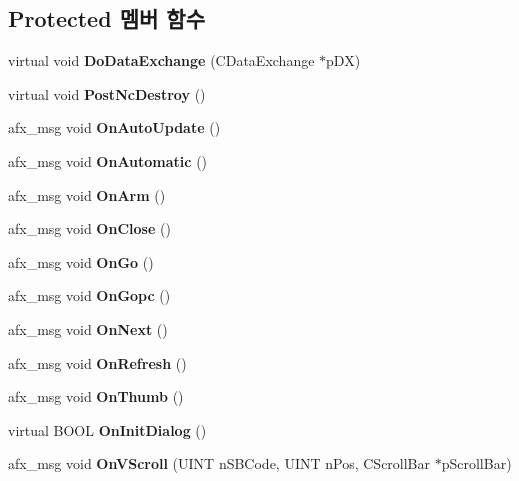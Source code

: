 \subsection*{Protected 멤버 함수}
\begin{DoxyCompactItemize}
\item 
\mbox{\label{class_disassemble_a41d0930174f47e08037b1ea675d03ba0}} 
virtual void {\bfseries Do\+Data\+Exchange} (C\+Data\+Exchange $\ast$p\+DX)
\item 
\mbox{\label{class_disassemble_a2ff6c6b502de3f37aaff6c2f188157a8}} 
virtual void {\bfseries Post\+Nc\+Destroy} ()
\item 
\mbox{\label{class_disassemble_a5423cb1c85c1e4bb05b3d4018c804826}} 
afx\+\_\+msg void {\bfseries On\+Auto\+Update} ()
\item 
\mbox{\label{class_disassemble_a713e75749b5c7c79927075b57431a298}} 
afx\+\_\+msg void {\bfseries On\+Automatic} ()
\item 
\mbox{\label{class_disassemble_a11695fe0ce9003a5cfcd58e86ad6047e}} 
afx\+\_\+msg void {\bfseries On\+Arm} ()
\item 
\mbox{\label{class_disassemble_a8f239c5117018f44ee0847b530a9eee1}} 
afx\+\_\+msg void {\bfseries On\+Close} ()
\item 
\mbox{\label{class_disassemble_add1cb356f3605cc46f9c83f29473db24}} 
afx\+\_\+msg void {\bfseries On\+Go} ()
\item 
\mbox{\label{class_disassemble_ad757b7defc104599f1a20730cf7f3d63}} 
afx\+\_\+msg void {\bfseries On\+Gopc} ()
\item 
\mbox{\label{class_disassemble_a9d25720f4d6c7a31281301b93b0ae02a}} 
afx\+\_\+msg void {\bfseries On\+Next} ()
\item 
\mbox{\label{class_disassemble_a9b66d72bb746fe9df6bbcb4831dbf8ad}} 
afx\+\_\+msg void {\bfseries On\+Refresh} ()
\item 
\mbox{\label{class_disassemble_a480844a650f1a7ab4a396ff1ffdd5655}} 
afx\+\_\+msg void {\bfseries On\+Thumb} ()
\item 
\mbox{\label{class_disassemble_a23e74e8f32758c5b6ff63914633e2ab5}} 
virtual B\+O\+OL {\bfseries On\+Init\+Dialog} ()
\item 
\mbox{\label{class_disassemble_a96149abe6cfe456c0d799dfe59b19826}} 
afx\+\_\+msg void {\bfseries On\+V\+Scroll} (U\+I\+NT n\+S\+B\+Code, U\+I\+NT n\+Pos, C\+Scroll\+Bar $\ast$p\+Scroll\+Bar)
\end{DoxyCompactItemize}


